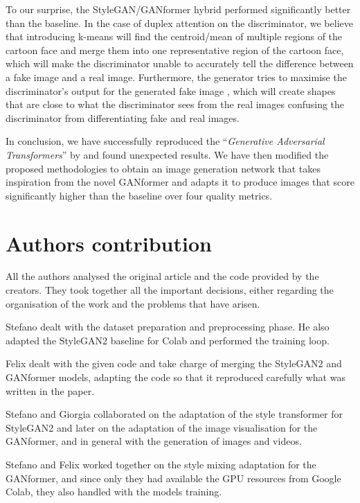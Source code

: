 \documentclass{article}
\begin{document}
To our surprise, the StyleGAN/GANformer hybrid performed significantly better than the baseline. In 
the case of duplex attention on the discriminator, we believe that introducing k-means will find the 
centroid/mean of multiple regions of the cartoon face and merge them into one representative region 
of the cartoon face, which will make the discriminator unable to accurately tell the difference 
between a fake image and a real image. Furthermore, the generator tries to maximise the 
discriminator's output for the generated fake image \cite{gulrajani_improved_2017, 
	arjovsky_wasserstein_2017}, which will create shapes that are close to what the discriminator 
	sees 
from the real images confusing the discriminator from differentiating fake and real images.

In conclusion, we have successfully reproduced the ``\emph{Generative Adversarial Transformers}'' 
by \citet{hudson2021generative} and found unexpected results.
We have then modified the proposed methodologies to obtain an image generation network that 
takes inspiration from the 
novel GANformer and adapts it to produce images that score significantly higher than the baseline 
over four quality metrics.

\section{Authors contribution}
All the authors analysed the original article and the code provided by the creators. 
They took together all the important decisions, either regarding the organisation of the work and the 
problems that have arisen.

Stefano dealt with the dataset preparation and preprocessing phase. He also adapted the StyleGAN2 
baseline for Colab and performed the training loop.

Felix dealt with the given code and take charge of merging the StyleGAN2 and GANformer models, 
adapting the code so that it reproduced carefully what was written in the paper.

Stefano and Giorgia collaborated on the adaptation of the style transformer for StyleGAN2 and later 
on the adaptation of the image visualisation for the GANformer, and in general with the generation 
of images and videos. 

Stefano and Felix worked together on the style mixing adaptation for the GANformer, and since only 
they had available the GPU resources from Google Colab, they also handled with the models training.
\end{document}
